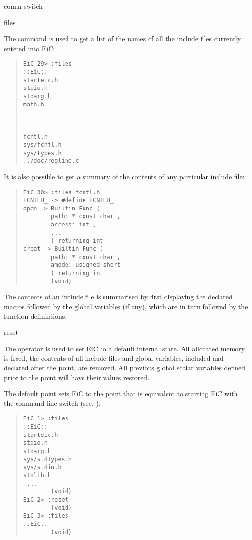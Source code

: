 \begin{Ventry}{comm-switch }
\item[files]
\label{item:files} 

      The  command is used to get a list of the names
of all the include files currently entered into EiC:

\begin{quote}
\begin{verbatim}
EiC 29> :files
::EiC::
starteic.h
stdio.h
stdarg.h
math.h

...

fcntl.h
sys/fcntl.h
sys/types.h
../doc/regline.c
\end{verbatim}
\end{quote}

It is also possible to get a summary of the contents of any
particular  include file:

\begin{quote}
\begin{verbatim}
EiC 30> :files fcntl.h
FCNTLH_ -> #define FCNTLH_
open -> Builtin Func (
        path: * const char ,
        access: int ,
        ...
        ) returning int
creat -> Builtin Func (
        path: * const char ,
        amode: usigned short
        ) returning int
        (void)

\end{verbatim}
\end{quote}

The contents of an include file is summarised by first displaying
the declared macros followed by the global variables (if any), which are
in turn followed by the function definintions.

\item[reset]
\label{item:reset} 

	The  operator is used to set EiC to a default
        internal state.  All allocated memory is freed, the contents
        of all include files and global variables, included and
        declared after the  point, are removed. All previous
        global scalar variables defined prior to the  point will have
        their values restored.

	The default  point sets EiC to the point that is
        equivalent to starting EiC with the  command line switch
        (see, ):

\begin{quote}
\begin{verbatim}
EiC 1> :files
::EiC::
starteic.h
stdio.h
stdarg.h
sys/stdtypes.h
sys/stdio.h
stdlib.h
 ...           
        (void)
EiC 2> :reset
        (void)
EiC 3> :files
::EiC::
        (void)
\end{verbatim}
\end{quote}


\end{Ventry}
